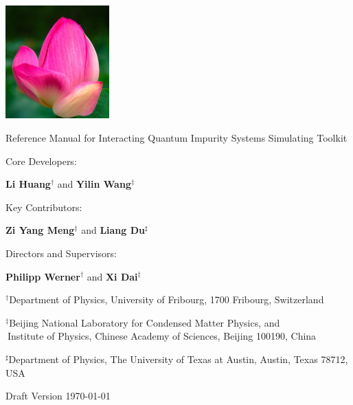 {
\pagestyle{plain}
\parindent 0pt

\includegraphics[width=4cm]{figure/cover.png}

\vskip 0.5cm

\Huge{\textsf{Reference Manual for {\color{red}I}nteracting 
{\color{cyan}Q}uantum {\color{cyan}I}mpurity {\color{cyan}S}ystems 
Simulating {\color{cyan}T}oolkit}}

\vskip 1.0cm
\Large{Core Developers:}

\Large{\textbf{Li Huang}$^{\dagger}$ and \textbf{Yilin Wang}$^{\ddagger}$}

\Large{Key Contributors:}

\Large{\textbf{Zi Yang Meng}$^{\ddagger}$ and \textbf{Liang Du}$^{\sharp}$}

\Large{Directors and Supervisors:}

\Large{\textbf{Philipp Werner}$^{\dagger}$ and \textbf{Xi Dai}$^{\ddagger}$}

\vskip 1.0cm
$^{\dagger}$\large{\textsf{Department of Physics, University of Fribourg, 1700 Fribourg, Switzerland}}

$^{\ddagger}$\large{\textsf{Beijing National Laboratory for Condensed Matter Physics, and \\ 
$^{\ }$Institute of Physics, Chinese Academy of Sciences, Beijing 100190, China}}

$^{\sharp}$\large{\textsf{Department of Physics, The University of Texas at Austin, Austin, Texas 78712, USA}}

\vskip 2.0cm
\textsf{Draft Version \today}

\vbox{}         
\clearpage
}

